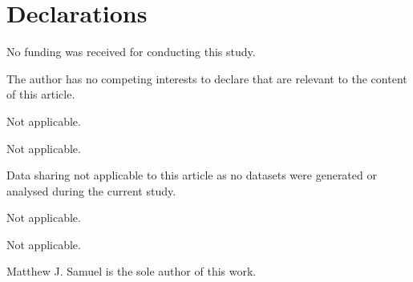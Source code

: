 \documentclass[pdflatex,sn-mathphys-num]{sn-jnl}
\numberwithin{equation}{subsection}
\theoremstyle{thmstyleone}
\theoremstyle{thmstylethree}
\theoremstyle{thmstyletwo}
\begin{document}
\section*{Declarations}

No funding was received for conducting this study.

The author has no competing interests to declare that are relevant to the content of this article.

Not applicable.

Not applicable.

Data sharing not applicable to this article as no datasets were generated or analysed during the current study.

Not applicable.

Not applicable.

Matthew J. Samuel is the sole author of this work.
\end{document}
